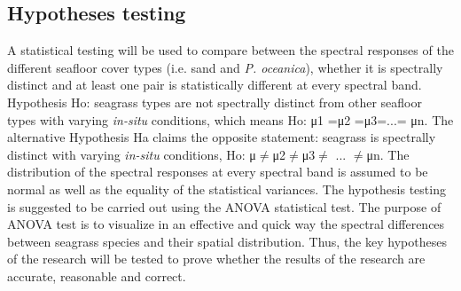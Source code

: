\documentclass[11pt]{article}
\begin{document}
\subsection{Hypotheses testing}
A statistical testing will be used to compare between the spectral responses of the different seafloor cover types (i.e. sand and \textit{P. oceanica}),
 whether it is spectrally distinct and at least one pair is statistically different at every spectral
band.
Hypothesis Ho: seagrass types are not spectrally distinct from other seafloor types with
varying \textit{in-situ} conditions, which means
Ho: μ1 =μ2 =μ3=...= μn.
The alternative Hypothesis Ha claims the opposite statement: seagrass is spectrally
distinct with varying \textit{in-situ} conditions, Ho: μ$\neq$μ2$\neq$μ3$\neq$ ... $\neq$μn.
The distribution of the spectral responses at every spectral band is assumed to be normal as well as
the equality of the statistical variances.
The hypothesis testing is suggested to be carried out using the \ac{ANOVA} statistical test. The purpose of
ANOVA test is to visualize in an effective and quick way the spectral differences between seagrass
species and their spatial distribution. Thus, the key hypotheses of the research will be tested to prove
whether the results of the research are accurate, reasonable and correct.
\end{document}

